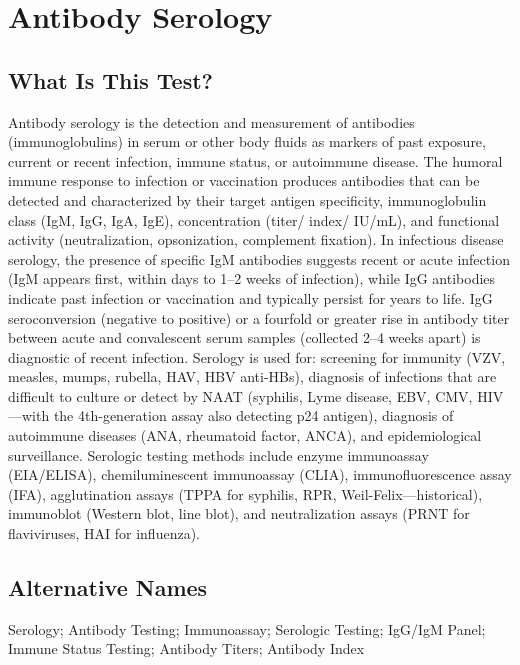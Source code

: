 \chapter{Antibody Serology}

\section*{What Is This Test?}
Antibody serology is the detection and measurement of antibodies (immunoglobulins) in serum or other body fluids as markers of past exposure, current or recent infection, immune status, or autoimmune disease. The humoral immune response to infection or vaccination produces antibodies that can be detected and characterized by their target antigen specificity, immunoglobulin class (IgM, IgG, IgA, IgE), concentration (titer/ index/ IU/mL), and functional activity (neutralization, opsonization, complement fixation). In infectious disease serology, the presence of specific IgM antibodies suggests recent or acute infection (IgM appears first, within days to 1--2 weeks of infection), while IgG antibodies indicate past infection or vaccination and typically persist for years to life. IgG seroconversion (negative to positive) or a fourfold or greater rise in antibody titer between acute and convalescent serum samples (collected 2--4 weeks apart) is diagnostic of recent infection. Serology is used for: screening for immunity (VZV, measles, mumps, rubella, HAV, HBV anti-HBs), diagnosis of infections that are difficult to culture or detect by NAAT (syphilis, Lyme disease, EBV, CMV, HIV---with the 4th-generation assay also detecting p24 antigen), diagnosis of autoimmune diseases (ANA, rheumatoid factor, ANCA), and epidemiological surveillance. Serologic testing methods include enzyme immunoassay (EIA/ELISA), chemiluminescent immunoassay (CLIA), immunofluorescence assay (IFA), agglutination assays (TPPA for syphilis, RPR, Weil-Felix---historical), immunoblot (Western blot, line blot), and neutralization assays (PRNT for flaviviruses, HAI for influenza).

\section*{Alternative Names}
Serology; Antibody Testing; Immunoassay; Serologic Testing; IgG/IgM Panel; Immune Status Testing; Antibody Titers; Antibody Index

